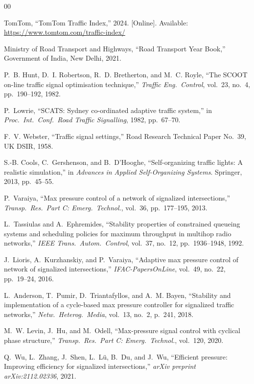 \documentclass[journal]{IEEEtran}
\begin{document}
\begin{thebibliography}{00}

TomTom, ``TomTom Traffic Index,'' 2024. [Online]. Available:
\url{https://www.tomtom.com/traffic-index/}

Ministry of Road Transport and Highways, ``Road Transport Year Book,''
Government of India, New Delhi, 2021.

P.~B. Hunt, D.~I. Robertson, R.~D. Bretherton, and M.~C. Royle,
``The SCOOT on-line traffic signal optimisation technique,''
\textit{Traffic Eng.\ Control}, vol.~23, no.~4, pp.~190--192, 1982.

P.~Lowrie, ``SCATS: Sydney co-ordinated adaptive traffic system,''
in \textit{Proc.\ Int.\ Conf.\ Road Traffic Signalling}, 1982, pp.~67--70.

F.~V. Webster, ``Traffic signal settings,'' Road Research Technical
Paper No.~39, UK DSIR, 1958.

S.-B. Cools, C.~Gershenson, and B.~D'Hooghe, ``Self-organizing traffic
lights: A realistic simulation,'' in \textit{Advances in Applied
Self-Organizing Systems}. Springer, 2013, pp.~45--55.

P.~Varaiya, ``Max pressure control of a network of signalized
intersections,'' \textit{Transp.\ Res.\ Part C: Emerg.\ Technol.},
vol.~36, pp.~177--195, 2013.

L.~Tassiulas and A.~Ephremides, ``Stability properties of constrained
queueing systems and scheduling policies for maximum throughput in
multihop radio networks,'' \textit{IEEE Trans.\ Autom.\ Control},
vol.~37, no.~12, pp.~1936--1948, 1992.

J.~Lioris, A.~Kurzhanskiy, and P.~Varaiya, ``Adaptive max pressure
control of network of signalized intersections,''
\textit{IFAC-PapersOnLine}, vol.~49, no.~22, pp.~19--24, 2016.

L.~Anderson, T.~Pumir, D.~Triantafyllos, and A.~M. Bayen, ``Stability and
implementation of a cycle-based max pressure controller for signalized
traffic networks,'' \textit{Netw.\ Heterog.\ Media}, vol.~13, no.~2,
p.~241, 2018.

M.~W. Levin, J.~Hu, and M.~Odell, ``Max-pressure signal control with
cyclical phase structure,'' \textit{Transp.\ Res.\ Part C: Emerg.\
Technol.}, vol.~120, 2020.

Q.~Wu, L.~Zhang, J.~Shen, L.~L\"u, B.~Du, and J.~Wu, ``Efficient
pressure: Improving efficiency for signalized intersections,''
\textit{arXiv preprint arXiv:2112.02336}, 2021.


\end{thebibliography}
\end{document}
